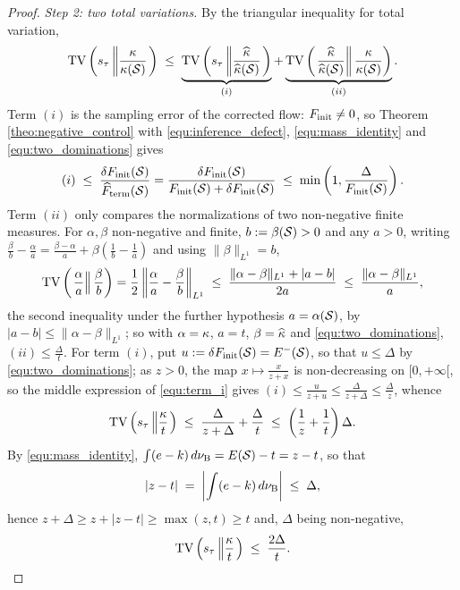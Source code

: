 \begin{proof}
\emph{Step 2: two total variations.} By the triangular inequality for total variation,
\begin{equation}
    \mathrm{TV}\left(s_\tau\left\|\frac{\kappa}{\kappa(\mathcal S)}\right.\right)\;\leq\;\underbrace{\mathrm{TV}\left(s_\tau\left\|\frac{\widehat{\kappa}}{\widehat{\kappa}(\mathcal S)}\right.\right)}_{(i)}+\underbrace{\mathrm{TV}\left(\left.\frac{\widehat{\kappa}}{\widehat{\kappa}(\mathcal S)}\right\|\frac{\kappa}{\kappa(\mathcal S)}\right)}_{(ii)} .
\end{equation}
Term $(i)$ is the sampling error of the corrected flow: $F_{\mathrm{init}}\neq0$, so Theorem \ref{theo:negative_control} with \eqref{equ:inference_defect}, \eqref{equ:mass_identity} and \eqref{equ:two_dominations} gives
\begin{equation}\label{equ:term_i}
    (i)\;\leq\;\frac{\delta F_{\mathrm{init}}(\mathcal S)}{\widehat{F}_{\mathrm{term}}(\mathcal S)} = \frac{\delta F_{\mathrm{init}}(\mathcal S)}{F_{\mathrm{init}}(\mathcal S)+\delta F_{\mathrm{init}}(\mathcal S)}\;\leq\;\min\left(1,\frac{\Delta}{F_{\mathrm{init}}(\mathcal S)}\right).
\end{equation}
Term $(ii)$ only compares the normalizations of two non-negative finite measures. For $\alpha,\beta$ non-negative and finite, $b:=\beta(\mathcal S)>0$ and any $a>0$, writing $\frac{\beta}{b}-\frac{\alpha}{a} = \frac{\beta-\alpha}{a}+\beta\left(\frac1b-\frac1a\right)$ and using $\|\beta\|_{L^1}=b$,
\begin{equation}\label{equ:normalization_lemma}
    \mathrm{TV}\left(\left.\frac{\alpha}{a}\right\|\frac{\beta}{b}\right) = \frac12\left\|\frac{\alpha}{a}-\frac{\beta}{b}\right\|_{L^1}\;\leq\;\frac{\|\alpha-\beta\|_{L^1}+|a-b|}{2a}\;\leq\;\frac{\|\alpha-\beta\|_{L^1}}{a},
\end{equation}
the second inequality under the further hypothesis $a=\alpha(\mathcal S)$, by $|a-b|\leq\|\alpha-\beta\|_{L^1}$; so with $\alpha=\kappa$, $a=t$, $\beta=\widehat{\kappa}$ and \eqref{equ:two_dominations}, $(ii)\leq\frac{\Delta}{t}$. For term $(i)$, put $u:=\delta F_{\mathrm{init}}(\mathcal S)=E^-(\mathcal S)$, so that $u\leq\Delta$ by \eqref{equ:two_dominations}; as $z>0$, the map $x\mapsto\frac{x}{z+x}$ is non-decreasing on $[0,+\infty[$, so the middle expression of \eqref{equ:term_i} gives $(i)\leq\frac{u}{z+u}\leq\frac{\Delta}{z+\Delta}\leq\frac{\Delta}{z}$, whence
\begin{equation}\label{equ:tv_chain}
    \mathrm{TV}\left(s_\tau\left\|\frac{\kappa}{t}\right.\right)\;\leq\;\frac{\Delta}{z+\Delta}+\frac{\Delta}{t}\;\leq\;\left(\frac1z+\frac1t\right)\Delta .
\end{equation}
By \eqref{equ:mass_identity}, $\int(e-k)\,d\nu_{\mathrm{B}} = E(\mathcal S)-t = z-t$, so that
\begin{equation}\label{equ:mass_defect}
    |z-t|\;=\;\left|\int(e-k)\,d\nu_{\mathrm{B}}\right|\;\leq\;\Delta ,
\end{equation}
hence $z+\Delta\geq z+|z-t|\geq\max(z,t)\geq t$ and, $\Delta$ being non-negative,
\begin{equation*}
    \mathrm{TV}\left(s_\tau\left\|\frac{\kappa}{t}\right.\right)\;\leq\;\frac{2\Delta}{t} .
\end{equation*}


\end{proof}
